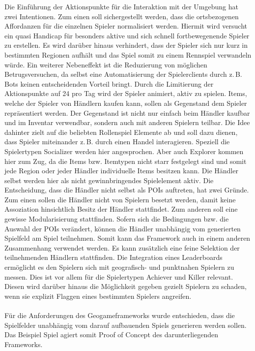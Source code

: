 Die Einführung der Aktionspunkte für die Interaktion mit der Umgebung hat zwei Intentionen. Zum einen soll sichergestellt werden, dass die ortsbezogenen Affordanzen für die einzelnen Spieler normalisiert werden. Hiermit wird versucht ein quasi Handicap für besonders aktive und sich schnell fortbewegenende Spieler zu erstellen. Es wird darüber hinaus verhindert, dass der Spieler sich nur kurz in bestimmten Regionen aufhält und das Spiel somit zu einem Rennspiel verwandeln würde.\cite{Schlieder.2005} Ein weiterer Nebeneffekt ist die Reduzierung von möglichen Betrugsversuchen, da selbst eine Automatisierung der Spielerclients durch z.\,B. Bots keinen entscheidenden Vorteil bringt.\cite{Golle.2005} Durch die Limitierung der Aktionspunkte auf 24 pro Tag wird der Spieler animiert, aktiv zu spielen. Items, welche der Spieler von Händlern kaufen kann, sollen als Gegenstand dem Spieler repräsentiert werden. Der Gegenstand ist nicht nur einfach beim Händler kaufbar und im Inventar verwendbar, sondern auch mit anderen Spielern teilbar. Die Idee dahinter zielt auf die beliebten Rollenspiel Elemente ab und soll dazu dienen, dass Spieler miteinander z.\,B. durch einen Handel interagieren. Speziell die Spielertypen Socializer werden hier angesprochen. Aber auch Explorer kommen hier zum Zug, da die Items bzw. Itemtypen nicht starr festgelegt sind und somit jede Region oder jeder Händler individuelle Items besitzen kann. Die Händler selbst werden hier als nicht gewinnbringendes Spielelement aktiv. Die Entscheidung, dass die Händler nicht selbst als POIs auftreten, hat zwei Gründe. Zum einen sollen die Händler nicht von Spielern \glqq besetzt\grqq{} werden, damit keine Assoziation hinsichtlich \glqq Besitz\grqq{} der Händler stattfindet. Zum anderen soll eine gewisse Modularisierung stattfinden. Sofern sich die Bedingungen bzw. die Auswahl der POIs verändert, können die Händler unabhängig vom generierten Spielfeld am Spiel teilnehmen. Somit kann das Framework auch in einem anderen Zusammenhang verwendet werden. Es kann zusätzlich eine feine Selektion der teilnehmenden Händlern stattfinden.
Die Integration eines Leaderboards ermöglicht es den Spielern sich mit geografisch- und punktnahen Spielern zu messen. Dies ist vor allem für die Spielertypen Achiever und Killer relevant. Diesen wird darüber hinaus die Möglichkeit gegeben gezielt Spielern zu schaden, wenn sie explizit Flaggen eines bestimmten Spielers angreifen.
\\\\
Für die Anforderungen des Geogameframeworks wurde entschieden, dass die Spielfelder unabhängig vom darauf aufbauenden Spiels generieren werden sollen. Das Beispiel Spiel agiert somit Proof of Concept des darunterliegenden Frameworks.
